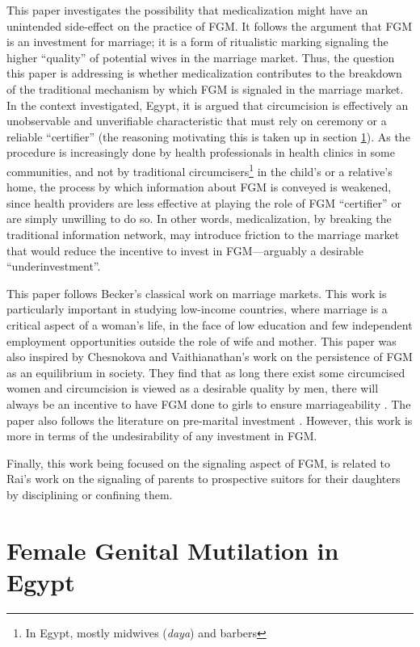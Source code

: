 \documentclass[12pt]{article}
\begin{document}
This paper investigates the possibility that medicalization might have an unintended side-effect on the practice of FGM.  It follows the argument that FGM is an investment for marriage; it is a form of ritualistic marking signaling the higher ``quality'' of potential wives in the marriage market. Thus, the question this paper is addressing is whether medicalization contributes to the breakdown of the traditional mechanism by which FGM is signaled in the marriage market.  In the context investigated, Egypt, it is argued that circumcision is effectively an unobservable and unverifiable characteristic that must rely on ceremony or a reliable ``certifier'' (the reasoning motivating this is taken up in section \ref{sec:fgmegypt}).  As the procedure is increasingly done by health professionals in health clinics in some communities, and not by traditional circumcisers\footnote{In Egypt, mostly midwives (\emph{daya}) and barbers} in the child's or a relative's home, the process by which information about FGM is conveyed is weakened, since health providers are less effective at playing the role of FGM ``certifier'' or are simply unwilling to do so. In other words, medicalization, by breaking the traditional information network, may introduce friction to the marriage market that would reduce the incentive to invest in FGM---arguably a desirable ``underinvestment''.

This paper follows Becker's \citeyearpar{Becker1981} classical work on marriage markets.  This work is particularly important in studying low-income countries, where marriage is a critical aspect of a woman's life, in the face of low education and few independent employment opportunities outside the role of wife and mother. This paper was also inspired by Chesnokova and Vaithianathan's \citeyearpar{Chesnokova2007} work on the persistence of FGM as an equilibrium in society. They find that as long there exist some circumcised women and circumcision is viewed as a desirable quality by men, there will always be an incentive to have FGM done to girls to ensure marriageability . The paper also follows the literature on pre-marital investment \citep{Burdett2001, Peters2002}.  However, this work is more in terms of the undesirability of any investment in FGM. 

Finally, this work being focused on the signaling aspect of FGM, is related to Rai's \citeyearpar{Raia} work on the signaling of parents to prospective suitors for their daughters by disciplining or confining them. 

\section{Female Genital Mutilation in Egypt}\label{sec:fgmegypt}
\end{document}
